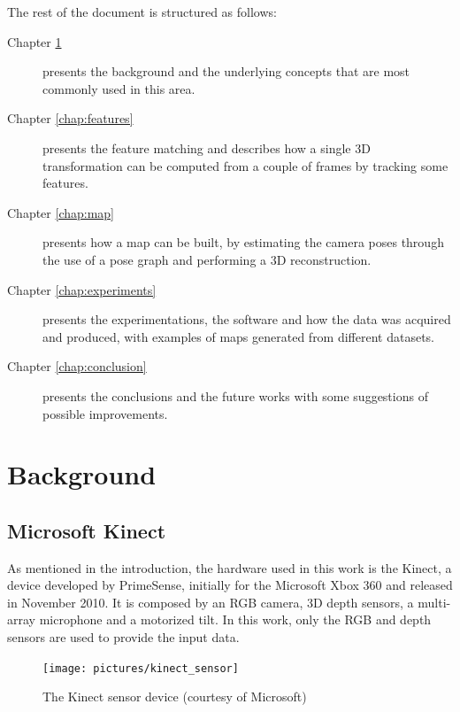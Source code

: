 The rest of the document is structured as follows:
\begin{description}
\item[Chapter \ref{chap:background}] presents the background and the underlying concepts that are most commonly used in this area.
\item[Chapter \ref{chap:features}] presents the feature matching and describes how a single 3D transformation can be computed  from a couple of frames by tracking some features.
\item[Chapter \ref{chap:map}] presents how a map can be built, by estimating the camera poses through the use of a pose graph and performing a 3D reconstruction.
\item[Chapter \ref{chap:experiments}] presents the experimentations, the software and how the data was acquired and produced, with examples of maps generated from different datasets.
\item[Chapter \ref{chap:conclusion}] presents the conclusions and the future works with some suggestions of possible improvements.
\end{description}

\chapter{Background}
\label{chap:background}

\section{Microsoft Kinect}

As mentioned in the introduction, the hardware used in this work is the Kinect, a device developed by PrimeSense, initially for the Microsoft Xbox 360 and released in November 2010. It is composed by an RGB camera, 3D depth sensors, a multi-array microphone and a motorized tilt. In this work, only the RGB and depth sensors are used to provide the input data.

\begin{figure}[H]
\centering
\texttt{[image: pictures/kinect\_sensor]}
\caption{The Kinect sensor device (courtesy of Microsoft)}
\end{figure}

